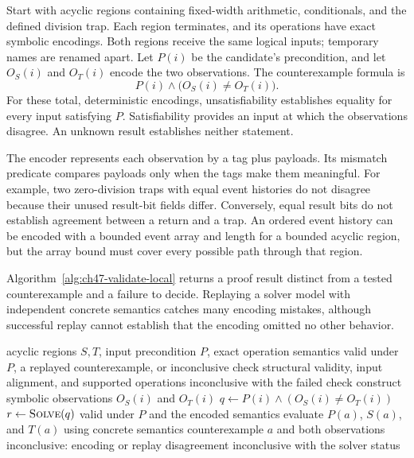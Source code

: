 Start with acyclic regions containing fixed-width arithmetic, conditionals, and the defined division trap.
Each region terminates, and its operations have exact symbolic encodings.
Both regions receive the same logical inputs; temporary names are renamed apart.
Let $P(i)$ be the candidate's precondition, and let $O_S(i)$ and $O_T(i)$ encode the two observations.
The counterexample formula is
\begin{equation}
  P(i)\land\bigl(O_S(i)\neq O_T(i)\bigr).
  \label{eq:ch47-counterexample}
\end{equation}
For these total, deterministic encodings, unsatisfiability establishes equality for every input satisfying $P$.
Satisfiability provides an input at which the observations disagree.
An unknown result establishes neither statement.

The encoder represents each observation by a tag plus payloads.
Its mismatch predicate compares payloads only when the tags make them meaningful.
For example, two zero-division traps with equal event histories do not disagree because their unused result-bit fields differ.
Conversely, equal result bits do not establish agreement between a return and a trap.
An ordered event history can be encoded with a bounded event array and length for a bounded acyclic region, but the array bound must cover every possible path through that region.

Algorithm~\ref{alg:ch47-validate-local} returns a proof result distinct from a tested counterexample and a failure to decide.
Replaying a solver model with independent concrete semantics catches many encoding mistakes, although successful replay cannot establish that the encoding omitted no other behavior.

\begin{algorithm}[htbp]
\caption{Validate a deterministic, terminating local rewrite.}
\label{alg:ch47-validate-local}
\begin{pseudocode}
\Require acyclic regions $S,T$, input precondition $P$, exact operation semantics
\Ensure valid under $P$, a replayed counterexample, or inconclusive
\State check structural validity, input alignment, and supported operations
  \State \Return inconclusive with the failed check
\EndIf
\State construct symbolic observations $O_S(i)$ and $O_T(i)$
\State $q\gets P(i)\land(O_S(i)\neq O_T(i))$
\State $r\gets\Call{Solve}{q}$
  \State \Return valid under $P$ and the encoded semantics
  \State evaluate $P(a)$, $S(a)$, and $T(a)$ using concrete semantics
    \State \Return counterexample $a$ and both observations
  \EndIf
  \State \Return inconclusive: encoding or replay disagreement
\Else
  \State \Return inconclusive with the solver status
\EndIf
\end{pseudocode}
\end{algorithm}

